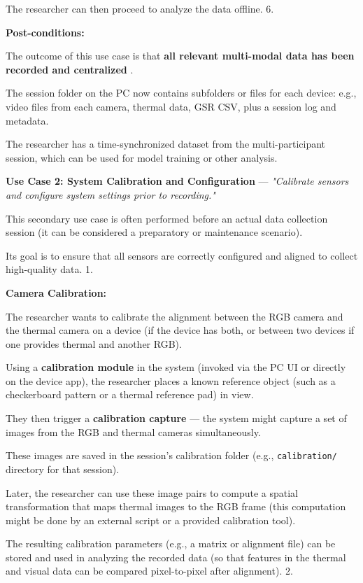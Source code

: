 The researcher can then proceed to analyze the data offline. 6.

\textbf{Post-conditions:}

The outcome of this use case is that \textbf{all relevant multi-modal data has been
recorded and centralized}
.

The session folder on the PC now contains subfolders or files for each device: e.g.,
video files from each camera, thermal data, GSR CSV, plus a session log and metadata.

The researcher has a time-synchronized dataset from the multi-participant
session, which can be used for model training or other analysis.

\textbf{Use Case 2: System Calibration and Configuration}
 --- \textit{"Calibrate sensors and configure system settings prior to recording."}

This secondary use case is often performed before an actual data collection session
(it can be considered a preparatory or maintenance scenario).

Its goal is to ensure that all sensors are correctly configured and aligned to
collect high-quality data.  1.

\textbf{Camera Calibration:}

The researcher wants to calibrate the alignment between the RGB camera and the
thermal camera on a device (if the device has both, or between two devices if one
provides thermal and another RGB).

Using a \textbf{calibration module}
 in the system (invoked via the PC UI or directly on the device app), the researcher
 places a known reference object (such as a checkerboard pattern or a thermal
 reference pad) in view.

They then trigger a \textbf{calibration capture}
 --- the system might capture a set of images from the RGB and thermal cameras
 simultaneously.

These images are saved in the session's calibration folder (e.g.,
\texttt{calibration/} directory for that session).

Later, the researcher can use these image pairs to compute a spatial transformation
that maps thermal images to the RGB frame (this computation might be done by an
external script or a provided calibration tool).

The resulting calibration parameters (e.g., a matrix or alignment file) can be stored
and used in analyzing the recorded data (so that features in the thermal and visual
data can be compared pixel-to-pixel after alignment).  2.

